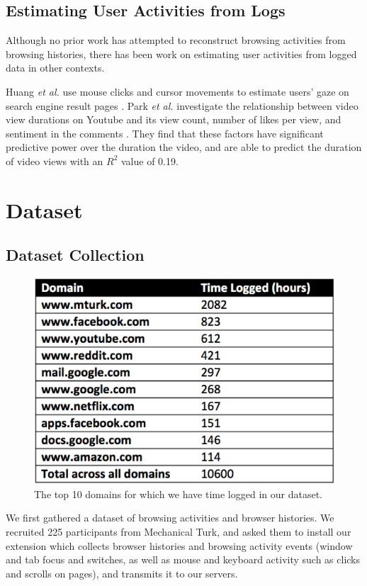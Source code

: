 \documentclass{sigchi}
\begin{document}
\subsection{Estimating User Activities from Logs}

Although no prior work has attempted to reconstruct browsing activities from browsing histories, there has been work on estimating user activities from logged data in other contexts.

Huang \emph{et al.} use mouse clicks and cursor movements to estimate users' gaze on search engine result pages \cite{huang2011no, huang2012user}. Park \emph{et al.} investigate the relationship between video view durations on Youtube and its view count, number of likes per view, and sentiment in the comments \cite{youtubeduration}. They find that these factors have significant predictive power over the duration the video, and are able to predict the duration of video views with an $R^2$ value of 0.19.

\section{Dataset}

\subsection{Dataset Collection}

\begin{figure}
    \centering
    \includegraphics[width=0.9\columnwidth]{top-domains}
    \caption{The top 10 domains for which we have time logged in our dataset.}
    \label{fig:top-domains}
\end{figure}


We first gathered a dataset of browsing activities and browser histories. We recruited 225 participants from Mechanical Turk, and asked them to install our extension which collects browser histories and browsing activity events (window and tab focus and switches, as well as mouse and keyboard activity such as clicks and scrolls on pages), and transmits it to our servers.
\end{document}
